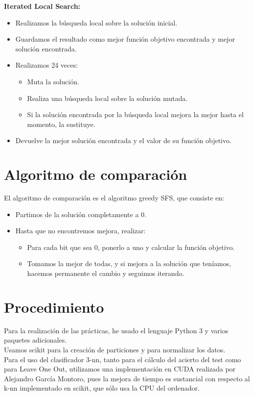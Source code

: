 \textbf{Iterated Local Search:}
\begin{itemize}
\item Realizamos la búsqueda local sobre la solución inicial.
\item Guardamos el resultado como mejor función objetivo encontrada y mejor solución encontrada.
\item Realizamos 24 veces:
\begin{itemize}
\item Muta la solución.
\item Realiza una búsqueda local sobre la solución mutada.
\item Si la solución encontrada por la búsqueda local mejora la mejor hasta el momento, la sustituye.
\end{itemize} 
\item Devuelve la mejor solución encontrada y el valor de su función objetivo.
\end{itemize} 

\newpage
\section{Algoritmo de comparación}
El algoritmo de comparación es el algoritmo greedy SFS, que consiste en:
\begin{itemize}
\item Partimos de la solución completamente a 0.
\item Hasta que no encontremos mejora, realizar:
\begin{itemize}
\item Para cada bit que sea 0, ponerlo a uno y calcular la función objetivo.
\item Tomamos la mejor de todas, y si mejora a la solución que teníamos, hacemos permanente el cambio y seguimos iterando.
\end{itemize} 
\end{itemize} 
\newpage
\section{Procedimiento}
Para la realización de las prácticas, he usado el lenguaje Python 3 y varios paquetes adicionales.\\

Usamos scikit para la creación de particiones y para normalizar los datos.\\

Para el uso del clasificador 3-nn, tanto para el cálculo del acierto del test  como para Leave One Out, utilizamos una implementación en CUDA realizada por Alejandro García Montoro, pues la mejora de tiempo es sustancial con respecto al k-nn implementado en scikit, que sólo usa la CPU del ordenador.\\

